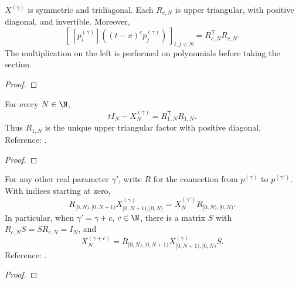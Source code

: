 \begin{supporting}
\begin{theorem}
\label{thm:semiclassical-hierarchy-matrices}
\leanok
$X^{(\gamma)}$ is symmetric and tridiagonal. Each $R_{c,N}$ is upper triangular,
with positive diagonal, and invertible. Moreover,
\[
 [\,[p_i^{(\gamma)}]((t-x)^c p_j^{(\gamma)})\,]_{i,j<N}
   =R_{c,N}^{\mathsf T}R_{c,N}.
\]
The multiplication on the left is performed on polynomials before taking the section.
\end{theorem}
\begin{proof}
\leanok
\end{proof}
\end{supporting}

\begin{theorem}
\label{thm:semiclassical-cholesky-shift}
\leanok
For every $N\in\N$,
\[
 tI_N-X^{(\gamma)}_N=R_{1,N}^{\mathsf T}R_{1,N}.
\]
Thus $R_{1,N}$ is the unique upper triangular factor with positive diagonal.
Reference: \cite[Section 3.1]{pgso}.
\end{theorem}
\begin{proof}
\leanok
\end{proof}

\begin{theorem}
\label{thm:semiclassical-padded-update}
\leanok
For any other real parameter $\gamma'$, write $R$ for the connection from
$p^{(\gamma)}$ to $p^{(\gamma')}$. With indices starting at zero,
\[
 R_{[0,N),[0,N+1)}X^{(\gamma)}_{[0,N+1),[0,N)}
   =X^{(\gamma')}_N R_{[0,N),[0,N)}.
\]
In particular, when $\gamma'=\gamma+c$, $c\in\N$, there is a matrix $S$ with
$R_{c,N}S=SR_{c,N}=I_N$, and
\[
 X^{(\gamma+c)}_N=
 R_{[0,N),[0,N+1)}X^{(\gamma)}_{[0,N+1),[0,N)}S.
\]
Reference: \cite[Sections 3.2 and 3.5]{pgso}.
\end{theorem}
\begin{proof}
\leanok
\end{proof}

